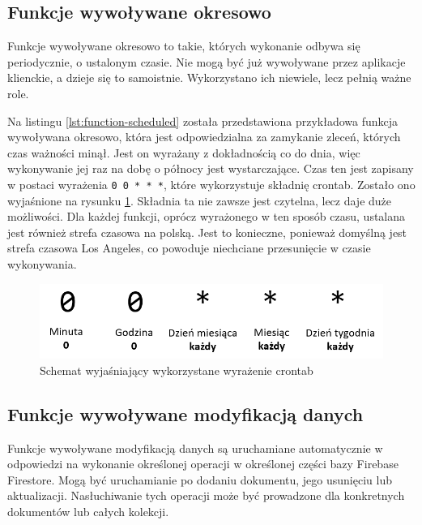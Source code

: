 \subsection{Funkcje wywoływane okresowo}

Funkcje wywoływane okresowo to takie, których wykonanie odbywa się periodycznie, o ustalonym czasie. Nie mogą być już wywoływane przez aplikacje klienckie, a dzieje się to samoistnie. Wykorzystano ich niewiele, lecz pełnią ważne role.

\begin{minipage}{\linewidth}

\end{minipage}

Na listingu \ref{lst:function-scheduled} została przedstawiona przykładowa funkcja wywoływana okresowo, która jest odpowiedzialna za zamykanie zleceń, których czas ważności minął. Jest on wyrażany z dokładnością co do dnia, więc wykonywanie jej raz na dobę o północy jest wystarczające. Czas ten jest zapisany w postaci wyrażenia \verb|0 0 * * *|, które wykorzystuje składnię crontab. Zostało ono wyjaśnione na rysunku \ref{fig:crontab}. Składnia ta nie zawsze jest czytelna, lecz daje duże możliwości. Dla każdej funkcji, oprócz wyrażonego w ten sposób czasu, ustalana jest również strefa czasowa na polską. Jest to konieczne, ponieważ domyślną jest strefa czasowa Los Angeles, co powoduje niechciane przesunięcie w czasie wykonywania.

\begin{figure}[ht!]
  \centering
  \includegraphics[width=\linewidth]{images/crontab.png}
  \caption{Schemat wyjaśniający wykorzystane wyrażenie crontab}
  \label{fig:crontab}
\end{figure}

\subsection{Funkcje wywoływane modyfikacją danych}

Funkcje wywoływane modyfikacją danych są uruchamiane automatycznie w odpowiedzi na wykonanie określonej operacji w określonej części bazy Firebase Firestore. Mogą być uruchamianie po dodaniu dokumentu, jego usunięciu lub aktualizacji. Nasłuchiwanie tych operacji może być prowadzone dla konkretnych dokumentów lub całych kolekcji.

